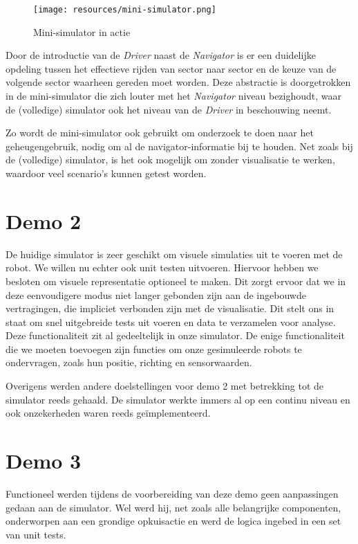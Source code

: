 \documentclass[12pt,a4paper]{report}
\begin{document}
\begin{figure}[htbp]
  \centering
  \texttt{[image: resources/mini-simulator.png]}
  \caption{Mini-simulator in actie}
  \label{fig:mini-simulator}
\end{figure}

Door de introductie van de \emph{Driver} naast de \emph{Navigator} is er een duidelijke opdeling tussen het effectieve rijden van sector naar sector en de keuze van de volgende sector waarheen gereden moet worden. Deze abstractie is doorgetrokken in de mini-simulator die zich louter met het \emph{Navigator} niveau bezighoudt, waar de (volledige) simulator ook het niveau van de \emph{Driver} in beschouwing neemt.

Zo wordt de mini-simulator ook gebruikt om onderzoek te doen naar het geheugengebruik, nodig om al de navigator-informatie bij te houden. Net zoals bij de (volledige) simulator, is het ook mogelijk om zonder visualisatie te werken, waardoor veel scenario's kunnen getest worden.

\section{Demo 2}

De huidige simulator is zeer geschikt om visuele simulaties uit te voeren met de robot. We willen nu echter ook unit testen uitvoeren. Hiervoor hebben we besloten om visuele representatie optioneel te maken. Dit zorgt ervoor dat we in deze eenvoudigere modus niet langer gebonden zijn aan de ingebouwde vertragingen, die impliciet verbonden zijn met de visualisatie.
Dit stelt ons in staat om snel uitgebreide tests uit voeren en data te verzamelen voor analyse.
Deze functionaliteit zit al gedeeltelijk in onze simulator. De enige functionaliteit die we moeten toevoegen zijn functies om onze gesimuleerde robots te ondervragen, zoals hun positie, richting en sensorwaarden.

Overigens werden andere doelstellingen voor demo 2 met betrekking tot de simulator reeds gehaald. De simulator werkte immers al op een continu niveau en ook onzekerheden waren reeds ge\"implementeerd.

\section{Demo 3}

Functioneel werden tijdens de voorbereiding van deze demo geen aanpassingen gedaan aan de simulator. Wel werd hij, net zoals alle belangrijke componenten, onderworpen aan een grondige opkuisactie en werd de logica ingebed in een set van unit tests.
\end{document}
